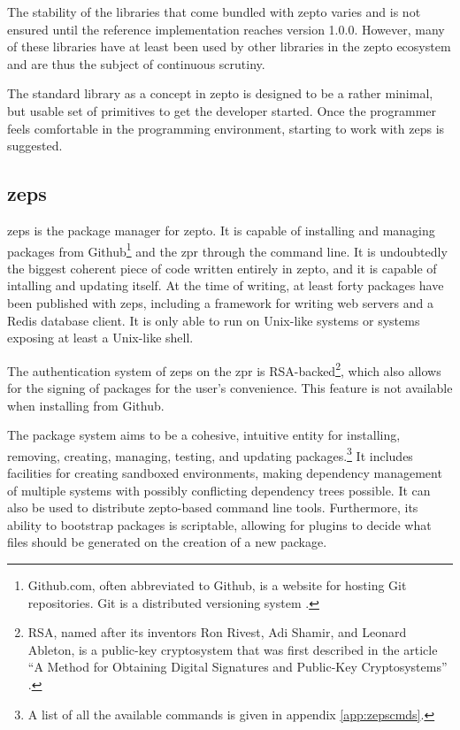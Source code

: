 \documentclass[oneside,11pt,xetex]{scrbook}
\begin{document}
The stability of the libraries that come bundled with zepto varies and is not
ensured until the reference implementation reaches version 1.0.0. However, many
of these libraries have at least been used by other libraries in the zepto
ecosystem and are thus the subject of continuous scrutiny.

The standard library as a concept in zepto is designed to be a rather minimal,
but usable set of primitives to get the developer started. Once the programmer
feels comfortable in the programming environment, starting to work with \gls{zeps}
is suggested.

\subsection{\gls{zeps}}

\gls{zeps} is the package manager for zepto. It is capable of installing and
managing packages from Github\footnote{Github.com, often abbreviated to Github,
is a website for hosting Git repositories. Git is a distributed versioning system
\parencite{GIT}.} and the \gls{zpr} through the command line. It
is undoubtedly the biggest coherent piece of code written entirely in zepto,
and it is capable of intalling and updating itself. At the time of writing,
at least forty packages have been published with \gls{zeps}, including a framework
for writing web servers and a Redis database client. It is only able to run
on Unix-like systems or systems exposing at least a Unix-like shell.

The authentication system of \gls{zeps} on the \gls{zpr} is RSA-backed\footnote{RSA,
named after its inventors Ron Rivest, Adi Shamir, and Leonard Ableton, is a public-key
cryptosystem that was first described in the article ``A Method for Obtaining Digital
Signatures and Public-Key Cryptosystems'' \parencite{RSA}.}, which
also allows for the signing of packages for the user's convenience. This feature
is not available when installing from Github.

The package system aims to be a cohesive, intuitive entity for installing,
removing, creating, managing, testing, and updating packages.\footnote{A list of
all the available commands is given in appendix \ref{app:zepscmds}.} It includes
facilities for creating sandboxed environments, making dependency management
of multiple systems with possibly conflicting dependency trees possible.
It can also be used to distribute zepto-based command line tools. Furthermore, its
ability to bootstrap packages is scriptable, allowing for plugins to
decide what files should be generated on the creation of a new package.
\end{document}
